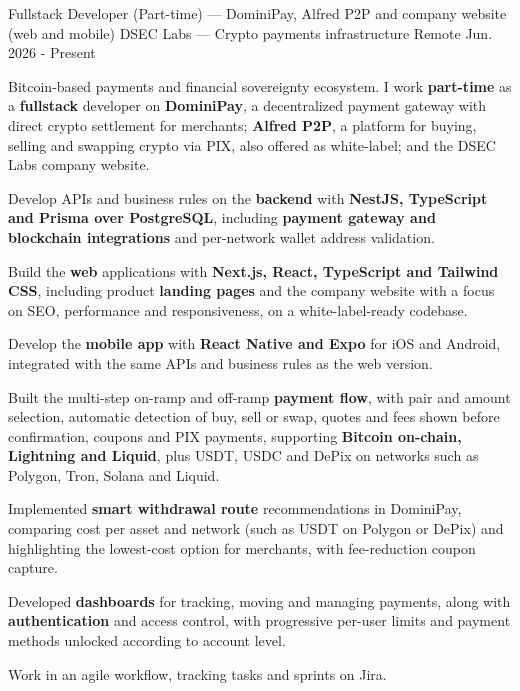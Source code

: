 

\begin{cventries}

  \cventry
    {Fullstack Developer (Part-time) --- DominiPay, Alfred P2P and company website (web and mobile)} %
    {DSEC Labs --- Crypto payments infrastructure} %
    {Remote} %
    {Jun. 2026 - Present} %
    {
      \begin{cvitems} %
        \item {Bitcoin-based payments and financial sovereignty ecosystem. I work \textbf{part-time} as a \textbf{fullstack} developer on \textbf{DominiPay}, a decentralized payment gateway with direct crypto settlement for merchants; \textbf{Alfred P2P}, a platform for buying, selling and swapping crypto via PIX, also offered as white-label; and the DSEC Labs company website.}
        \item {Develop APIs and business rules on the \textbf{backend} with \textbf{NestJS, TypeScript and Prisma over PostgreSQL}, including \textbf{payment gateway and blockchain integrations} and per-network wallet address validation.}
        \item {Build the \textbf{web} applications with \textbf{Next.js, React, TypeScript and Tailwind CSS}, including product \textbf{landing pages} and the company website with a focus on SEO, performance and responsiveness, on a white-label-ready codebase.}
        \item {Develop the \textbf{mobile app} with \textbf{React Native and Expo} for iOS and Android, integrated with the same APIs and business rules as the web version.}
        \item {Built the multi-step on-ramp and off-ramp \textbf{payment flow}, with pair and amount selection, automatic detection of buy, sell or swap, quotes and fees shown before confirmation, coupons and PIX payments, supporting \textbf{Bitcoin on-chain, Lightning and Liquid}, plus USDT, USDC and DePix on networks such as Polygon, Tron, Solana and Liquid.}
        \item {Implemented \textbf{smart withdrawal route} recommendations in DominiPay, comparing cost per asset and network (such as USDT on Polygon or DePix) and highlighting the lowest-cost option for merchants, with fee-reduction coupon capture.}
        \item {Developed \textbf{dashboards} for tracking, moving and managing payments, along with \textbf{authentication} and access control, with progressive per-user limits and payment methods unlocked according to account level.}
        \item {Work in an agile workflow, tracking tasks and sprints on Jira.}
      \end{cvitems}
    }


\end{cventries}
